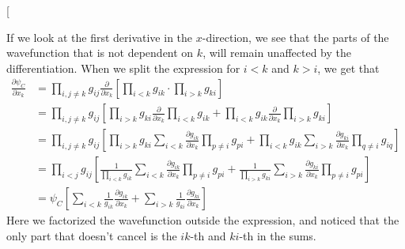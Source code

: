 \documentclass[twocolumns, a4paper,10pt,fleqn]{extarticle}
\newcommand{\equ}[1]{{\small\begin{align}#1\end{align}}}
\begin{document}
\twocolumn[{%
If we look at the first derivative in the $x$-direction, 
we see that the parts of the wavefunction that is not dependent on $k$, 
will remain unaffected by the 
differentiation.
When we split the expression for $i<k$ and $k>i$, we get that
\equ{
  \frac{\partial\psi_C}{\partial x_k}&=\prod_{i,j\neq k} g_{ij}
    \frac{\partial}{\partial x_k}
    \left[ \prod_{i<k} g_{ik} \cdot \prod_{i>k} g_{ki} \right]\nonumber\\
    &=\prod_{i,j\neq k} g_{ij}
      \left[\prod_{i>k} g_{ki}\frac{\partial}{\partial x_k}\prod_{i<k} g_{ik} 
      + \prod_{i<k} g_{ik} \frac{\partial}{\partial x_k}\prod_{i>k} g_{ki} \right]
      \nonumber\\
    &=\prod_{i,j\neq k} g_{ij}
      \left[\prod_{i>k} g_{ki} \sum_{i<k} \frac{\partial g_{ik}}{\partial x_k} \prod_{p\neq i} g_{pi}
      + \prod_{i<k} g_{ik} \sum_{i>k} \frac{\partial g_{ki}}{\partial x_k} \prod_{q\neq i} g_{iq} \right]
      \nonumber\\
    &=\prod_{i<j} g_{ij}
      \left[\frac{1}{\prod_{i<k} g_{ik}} \sum_{i<k} 
      \frac{\partial g_{ik}}{\partial x_k} \prod_{p\neq i} g_{pi}
      + \frac{1}{\prod_{i>k} g_{ki}} \sum_{i>k} 
      \frac{\partial g_{ki}}{\partial x_k} \prod_{p\neq i} g_{pi} \right]
      \nonumber\\
    &=\psi_C
      \left[\sum_{i<k} \frac{1}{g_{ik}} \frac{\partial g_{ik}}{\partial x_k}
      +\sum_{i>k} \frac{1}{g_{ki}} \frac{\partial g_{ki}}{\partial x_k} \right]
      \label{DpsiC}
}
Here we factorized the wavefunction outside the expression, 
and noticed that the only part that doesn't cancel is the $ik$-th and $ki$-th
in the sums.

}
\end{document}
